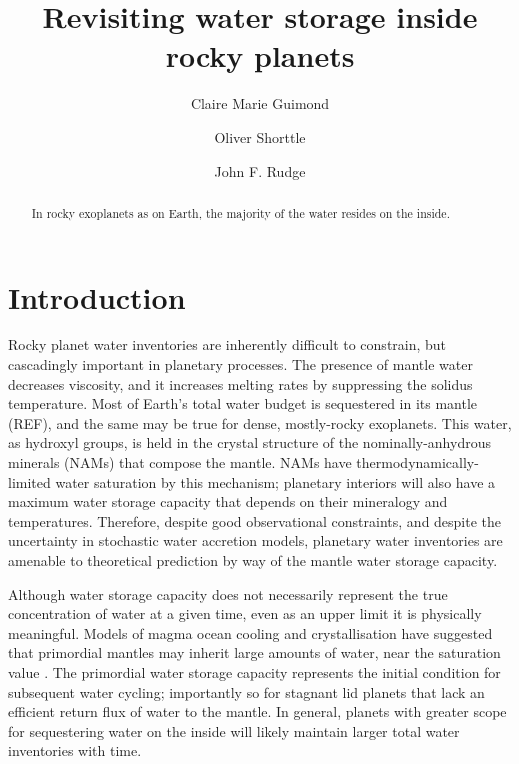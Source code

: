 \documentclass[linenumbers]{aastex631}
\begin{document}
\linenumbers

\title{Revisiting water storage inside rocky planets}

\author{Claire Marie Guimond}

\author{Oliver Shorttle}

\author{John F. Rudge}


\begin{abstract}
    In rocky exoplanets as on Earth, the majority of the water resides on the inside. 
\end{abstract}


\section{Introduction}

Rocky planet water inventories are inherently difficult to constrain, but cascadingly important in planetary processes. The presence of mantle water decreases viscosity, and it increases melting rates by suppressing the solidus temperature. %
Most of Earth's total water budget is sequestered in its mantle (REF), and the same may be true for dense, mostly-rocky exoplanets. This water, as hydroxyl groups, is held in the crystal structure of the nominally-anhydrous minerals (NAMs) that compose the mantle. NAMs have thermodynamically-limited water saturation by this mechanism; planetary interiors will also have a maximum water storage capacity that depends on their mineralogy and temperatures. Therefore, despite good observational constraints, and despite the uncertainty in stochastic water accretion models, planetary water inventories are amenable to theoretical prediction by way of the mantle water storage capacity.

Although water storage capacity does not necessarily represent the true concentration of water at a given time, even as an upper limit it is physically meaningful. Models of magma ocean cooling and crystallisation have suggested that primordial mantles may inherit large amounts of water, near the saturation value \citep{tikoo_fate_2017, dorn_hidden_2021}. The primordial water storage capacity represents the initial condition for subsequent water cycling; importantly so for stagnant lid planets that lack an efficient return flux of water to the mantle. In general, planets with greater scope for sequestering water on the inside will likely maintain larger total water inventories with time. 
\end{document}
